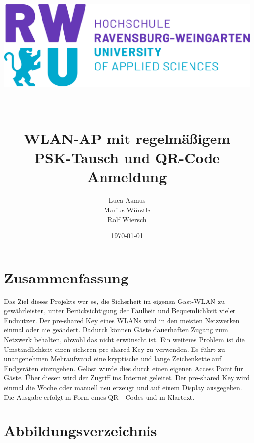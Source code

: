 \documentclass[a4paper,11pt,singlespacing]{article}
\begin{document}
	\setlength{\parindent}{0ex}
	
	\begin{titlepage}
		\author{Luca Asmus\\ Marius Würstle\\Rolf Wiersch}
		\title{\includegraphics[scale=0.3]{rwu_logo_hor-lila-cyan_rgb_0} \\ ~\\ ~\\ WLAN-AP mit regelmäßigem PSK-Tausch und QR-Code Anmeldung \vspace{8cm}}
		\date{\today}
		\maketitle
		\thispagestyle{empty}
    	\end{titlepage}
    	
    	\section{Zusammenfassung}
    	Das Ziel dieses Projekts war es, die Sicherheit im eigenen Gast-WLAN zu gewährleisten, unter Berücksichtigung der Faulheit und Bequemlichkeit vieler Endnutzer. Der pre-shared Key eines WLANs wird in den meisten Netzwerken einmal oder nie geändert. Dadurch können Gäste dauerhaften Zugang zum Netzwerk behalten, obwohl das nicht erwünscht ist. Ein weiteres Problem ist die Umständlichkeit einen sicheren pre-shared Key zu verwenden. Es führt zu unangenehmen Mehraufwand eine kryptische und lange Zeichenkette auf Endgeräten einzugeben. Gelöst wurde dies durch einen eigenen Access Point für Gäste. Über diesen wird der Zugriff ins Internet geleitet. Der pre-shared Key wird einmal die Woche oder manuell neu erzeugt und auf einem Display ausgegeben. Die Ausgabe erfolgt in Form eines QR - Codes und in Klartext.   \\

    	
    	
    	\tableofcontents
    	\newpage
    	
    	\section{Abbildungsverzeichnis}
    	\listoffigures
    	\newpage
    	
\end{document}
